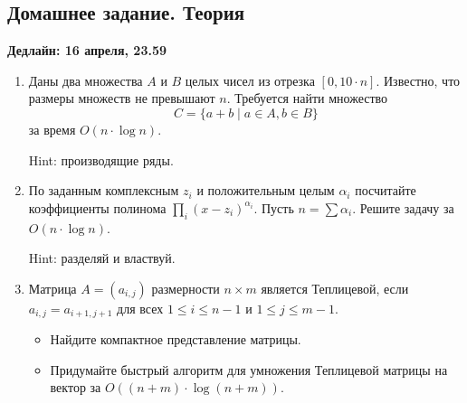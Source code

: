 \subsection{Домашнее задание. Теория}
\textbf{Дедлайн: 16 апреля, 23.59}
\begin{enumerate}

  \item Даны два множества $A$ и $B$ целых чисел из отрезка $[0, 10 \cdot n]$.
  Известно, что размеры множеств не превышают $n$. Требуется найти множество
  $$
    C = \{ a + b\;|\;a\in A, b \in B\}
  $$
  за время $O(n \cdot \log n)$.
  
  Hint: производящие ряды.


  \item По заданным комплексным $z_i$ и положительным целым $\alpha_i$ посчитайте
  коэффициенты полинома $\prod_i (x - z_i)^{\alpha_i}$. Пусть $n = \sum \alpha_i$.
  Решите задачу за $O(n \cdot \log n)$.

  Hint: разделяй и властвуй.  


  \item Матрица $A = (a_{i,j})$ размерности $n \times m$ является Теплицевой, 
  если $a_{i,j} = a_{i + 1, j + 1}$ для всех $1 \leq i \leq n - 1$ и $1 \leq j \leq m - 1$.
  \begin{itemize}
    \item Найдите компактное представление матрицы.
    \item Придумайте быстрый алгоритм для умножения Теплицевой матрицы на вектор за $O((n + m) \cdot \log (n + m))$.    
  \end{itemize} 


\end{enumerate}



\clearpage
